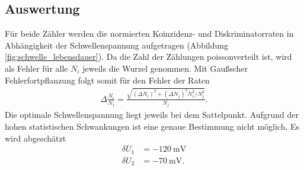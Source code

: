 \subsection{Auswertung}
Für beide Zähler werden die normierten Koinzidenz- und Diskriminatorraten in Abhängigkeit der Schwellenspannung aufgetragen (Abbildung \ref{fig:schwelle_lebensdauer}). Da die Zahl der Zählungen poissonverteilt ist, wird als Fehler für alle $N_i$ jeweils die Wurzel genommen. Mit Gaußscher Fehlerfortpflanzung folgt somit für den Fehler der Raten 
\begin{align*}
  \Delta \frac{N_i}{N_j}=\frac{\sqrt{(\Delta N_i)^2+(\Delta N_j)^2N_i^2/N_j^2}}{N_j}.
\end{align*} 
Die optimale Schwellenspannung liegt jeweils bei dem Sattelpunkt. Aufgrund der hohen statistischen Schwankungen ist eine genaue Bestimmung nicht möglich. Es wird abgeschätzt
\begin{align*}
  \delta U_1&=-\SI{120}{\milli\volt}\\
  \delta U_2&=-\SI{70}{\milli\volt}.
\end{align*} 

